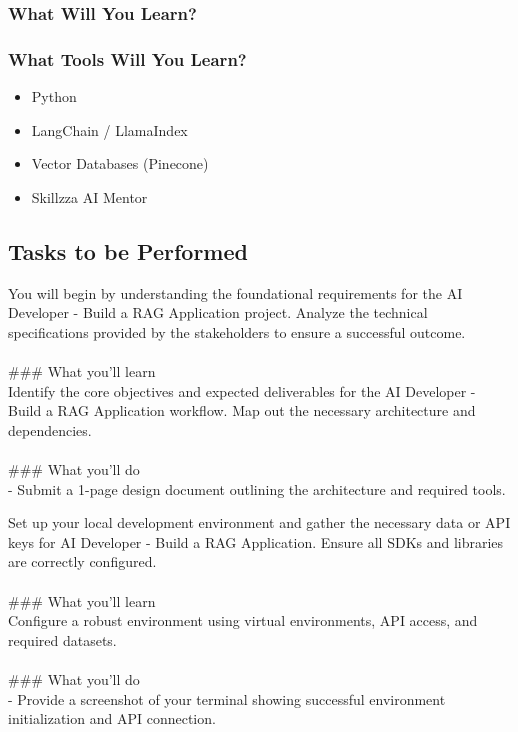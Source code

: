 \documentclass{article}
\begin{document}
\subsubsection*{What Will You Learn?}
\begin{itemize}
\end{itemize}

\subsubsection*{What Tools Will You Learn?}
\begin{itemize}
    \item Python
    \item LangChain / LlamaIndex
    \item Vector Databases (Pinecone)
    \item Skillzza AI Mentor
\end{itemize}

\subsection*{Tasks to be Performed}
You will begin by understanding the foundational requirements for the AI Developer - Build a RAG Application project. Analyze the technical specifications provided by the stakeholders to ensure a successful outcome. \\
 \\
### What you'll learn \\
Identify the core objectives and expected deliverables for the AI Developer - Build a RAG Application workflow. Map out the necessary architecture and dependencies. \\
 \\
### What you'll do \\
- Submit a 1-page design document outlining the architecture and required tools.

Set up your local development environment and gather the necessary data or API keys for AI Developer - Build a RAG Application. Ensure all SDKs and libraries are correctly configured. \\
 \\
### What you'll learn \\
Configure a robust environment using virtual environments, API access, and required datasets. \\
 \\
### What you'll do \\
- Provide a screenshot of your terminal showing successful environment initialization and API connection.
\end{document}
